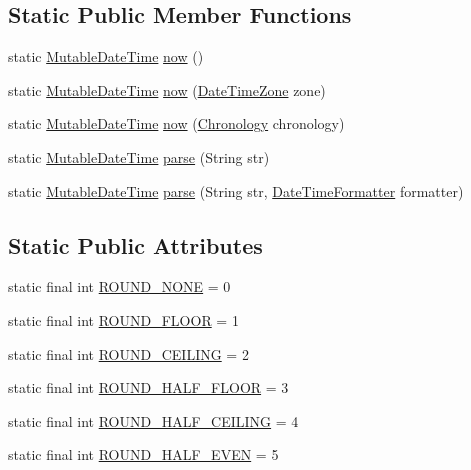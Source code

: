 \subsection*{Static Public Member Functions}
\begin{DoxyCompactItemize}
\item 
static \hyperlink{classorg_1_1joda_1_1time_1_1_mutable_date_time}{Mutable\-Date\-Time} \hyperlink{classorg_1_1joda_1_1time_1_1_mutable_date_time_a91f0c0d9e60481a6fa3914bb3ec7087f}{now} ()
\item 
static \hyperlink{classorg_1_1joda_1_1time_1_1_mutable_date_time}{Mutable\-Date\-Time} \hyperlink{classorg_1_1joda_1_1time_1_1_mutable_date_time_aed523ad7a172a5b0e4eb1ecd6f2eb075}{now} (\hyperlink{classorg_1_1joda_1_1time_1_1_date_time_zone}{Date\-Time\-Zone} zone)
\item 
static \hyperlink{classorg_1_1joda_1_1time_1_1_mutable_date_time}{Mutable\-Date\-Time} \hyperlink{classorg_1_1joda_1_1time_1_1_mutable_date_time_ae8a15cbc908400d460a0a264c65f87cc}{now} (\hyperlink{classorg_1_1joda_1_1time_1_1_chronology}{Chronology} chronology)
\item 
static \hyperlink{classorg_1_1joda_1_1time_1_1_mutable_date_time}{Mutable\-Date\-Time} \hyperlink{classorg_1_1joda_1_1time_1_1_mutable_date_time_aa5e2bde380864ec54bcea204e4276e3b}{parse} (String str)
\item 
static \hyperlink{classorg_1_1joda_1_1time_1_1_mutable_date_time}{Mutable\-Date\-Time} \hyperlink{classorg_1_1joda_1_1time_1_1_mutable_date_time_aaf6f5a636f26c48e9f61c5068f169ec3}{parse} (String str, \hyperlink{classorg_1_1joda_1_1time_1_1format_1_1_date_time_formatter}{Date\-Time\-Formatter} formatter)
\end{DoxyCompactItemize}
\subsection*{Static Public Attributes}
\begin{DoxyCompactItemize}
\item 
static final int \hyperlink{classorg_1_1joda_1_1time_1_1_mutable_date_time_a39179457a6e84290d7985378db4ec225}{R\-O\-U\-N\-D\-\_\-\-N\-O\-N\-E} = 0
\item 
static final int \hyperlink{classorg_1_1joda_1_1time_1_1_mutable_date_time_aa3485f487dd253880c4a38a07ce3e6ab}{R\-O\-U\-N\-D\-\_\-\-F\-L\-O\-O\-R} = 1
\item 
static final int \hyperlink{classorg_1_1joda_1_1time_1_1_mutable_date_time_a49bfcacf438b1f423295460673c80b9c}{R\-O\-U\-N\-D\-\_\-\-C\-E\-I\-L\-I\-N\-G} = 2
\item 
static final int \hyperlink{classorg_1_1joda_1_1time_1_1_mutable_date_time_a45db276a63391b0ec3d6a20e75ed2d3c}{R\-O\-U\-N\-D\-\_\-\-H\-A\-L\-F\-\_\-\-F\-L\-O\-O\-R} = 3
\item 
static final int \hyperlink{classorg_1_1joda_1_1time_1_1_mutable_date_time_a9e588c9009469120f0c84e24607ef43c}{R\-O\-U\-N\-D\-\_\-\-H\-A\-L\-F\-\_\-\-C\-E\-I\-L\-I\-N\-G} = 4
\item 
static final int \hyperlink{classorg_1_1joda_1_1time_1_1_mutable_date_time_aaabdd51ce47f2ec90511a2e5ecededc5}{R\-O\-U\-N\-D\-\_\-\-H\-A\-L\-F\-\_\-\-E\-V\-E\-N} = 5
\end{DoxyCompactItemize}
